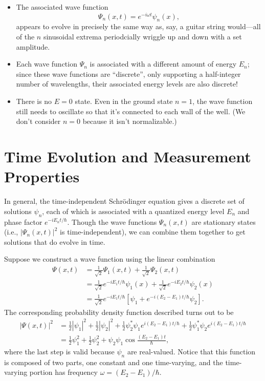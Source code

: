 \documentclass[../p052main.tex]{subfiles}
\begin{document}
\begin{itemize}
    \item The associated wave function
    \[ \Psi_n(x,t) = e^{-i \omega t} \psi_n(x), \]
    appears to evolve in precisely the same way as, say, a guitar string would---all of the $n$ sinusoidal extrema periodcially wriggle up and down with a set amplitude.
    \item Each wave function $\Psi_n$ is associated with a different amount of energy $E_n$; since these wave functions are ``discrete'', only supporting a half-integer number of wavelengths, their associated energy levels are also discrete!
    \item There is no $E = 0$ state.
    Even in the ground state $n=1$, the wave function still needs to oscillate so that it's connected to each wall of the well.
    (We don't consider $n=0$ because it isn't normalizable.)
\end{itemize}

\section{Time Evolution and Measurement Properties}
In general, the time-independent Schrödinger equation gives a discrete set of solutions $\psi_n$, each of which is associated with a quantized energy level $E_n$ and phase factor $e^{-i E_n t / \hbar}$.
Though the wave functions $\Psi_n(x,t)$ are stationary states (i.e., $|\Psi_n(x,t)|^2$ is time-independent), we can combine them together to get solutions that do evolve in time.

\begin{example}[]
    Suppose we construct a wave function using the linear combination
    \begin{align*}
        \Psi(x,t) &= \frac{1}{\sqrt{2}} \Psi_1(x,t) + \frac{1}{\sqrt{2}} \Psi_2(x,t) \\
        &= \frac{1}{\sqrt{2}} e^{-i E_1 t / \hbar} \psi_1(x) + \frac{1}{\sqrt{2}} e^{-i E_2 t / \hbar} \psi_2(x) \\
        &= \frac{1}{\sqrt{2}} e^{-i E_1 t /\hbar} \left[ \psi_1 + e^{-i (E_2 - E_1) t / \hbar} \psi_2 \right].
    \end{align*}
    The corresponding probability density function described turns out to be
    \begin{align*}
        |\Psi(x,t)|^2 &= \frac{1}{2} |\psi_1|^2 + \frac{1}{2}|\psi_2|^2 + \frac{1}{2} \psi_2^* \psi_1 e^{i (E_2 - E_1) t /\hbar} + \frac{1}{2} \psi_1^* \psi_2 e^{i (E_2 - E_1) t /\hbar} \\
        &= \frac{1}{2} \psi_1^2 + \frac{1}{2} \psi_2^2 + \psi_2 \psi_1 \cos \frac{(E_2 - E_1) t}{\hbar},
    \end{align*}
    where the last step is valid because $\psi_n$ are real-valued.
    Notice that this function is composed of two parts, one constant and one time-varying, and the time-varying portion has frequency $\omega = (E_2 - E_1) / \hbar$.
\end{example}
\end{document}
